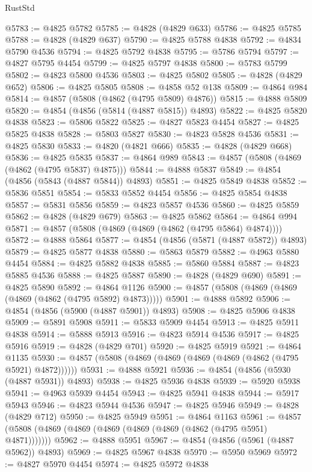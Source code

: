 \begin{lexlean}{RustStd}
\begin{coremodule}
@5783 := @4825 @5782
@5785 := @4828 (@4829 @633)
@5786 := @4825 @5785
@5788 := @4828 (@4829 @637)
@5790 := @4825 @5788 @4838
@5792 := @4834 @5790 @4536
@5794 := @4825 @5792 @4838
@5795 := @5786 @5794
@5797 := @4827 @5795 @4454
@5799 := @4825 @5797 @4838
@5800 := @5783 @5799
@5802 := @4823 @5800 @4536
@5803 := @4825 @5802
@5805 := @4828 (@4829 @652)
@5806 := @4825 @5805
@5808 := @4858 @52 @138
@5809 := @4864 @984
@5814 := @4857 (@5808 (@4862 (@4795 @5809) @4876))
@5815 := @4888 @5809
@5820 := @4854 (@4856 (@5814 (@4887 @5815)) @4893)
@5822 := @4825 @5820 @4838
@5823 := @5806 @5822
@5825 := @4827 @5823 @4454
@5827 := @4825 @5825 @4838
@5828 := @5803 @5827
@5830 := @4823 @5828 @4536
@5831 := @4825 @5830
@5833 := @4820 (@4821 @666)
@5835 := @4828 (@4829 @668)
@5836 := @4825 @5835
@5837 := @4864 @989
@5843 := @4857 (@5808 (@4869 (@4862 (@4795 @5837) @4875)))
@5844 := @4888 @5837
@5849 := @4854 (@4856 (@5843 (@4887 @5844)) @4893)
@5851 := @4825 @5849 @4838
@5852 := @5836 @5851
@5854 := @5833 @5852 @4454
@5856 := @4825 @5854 @4838
@5857 := @5831 @5856
@5859 := @4823 @5857 @4536
@5860 := @4825 @5859
@5862 := @4828 (@4829 @679)
@5863 := @4825 @5862
@5864 := @4864 @994
@5871 := @4857 (@5808 (@4869 (@4869 (@4862 (@4795 @5864) @4874))))
@5872 := @4888 @5864
@5877 := @4854 (@4856 (@5871 (@4887 @5872)) @4893)
@5879 := @4825 @5877 @4838
@5880 := @5863 @5879
@5882 := @4963 @5880 @4454
@5884 := @4825 @5882 @4838
@5885 := @5860 @5884
@5887 := @4823 @5885 @4536
@5888 := @4825 @5887
@5890 := @4828 (@4829 @690)
@5891 := @4825 @5890
@5892 := @4864 @1126
@5900 := @4857 (@5808 (@4869 (@4869 (@4869 (@4862 (@4795 @5892) @4873)))))
@5901 := @4888 @5892
@5906 := @4854 (@4856 (@5900 (@4887 @5901)) @4893)
@5908 := @4825 @5906 @4838
@5909 := @5891 @5908
@5911 := @5833 @5909 @4454
@5913 := @4825 @5911 @4838
@5914 := @5888 @5913
@5916 := @4823 @5914 @4536
@5917 := @4825 @5916
@5919 := @4828 (@4829 @701)
@5920 := @4825 @5919
@5921 := @4864 @1135
@5930 := @4857 (@5808 (@4869 (@4869 (@4869 (@4869 (@4862 (@4795 @5921) @4872))))))
@5931 := @4888 @5921
@5936 := @4854 (@4856 (@5930 (@4887 @5931)) @4893)
@5938 := @4825 @5936 @4838
@5939 := @5920 @5938
@5941 := @4963 @5939 @4454
@5943 := @4825 @5941 @4838
@5944 := @5917 @5943
@5946 := @4823 @5944 @4536
@5947 := @4825 @5946
@5949 := @4828 (@4829 @712)
@5950 := @4825 @5949
@5951 := @4864 @1163
@5961 := @4857 (@5808 (@4869 (@4869 (@4869 (@4869 (@4869 (@4862 (@4795 @5951) @4871)))))))
@5962 := @4888 @5951
@5967 := @4854 (@4856 (@5961 (@4887 @5962)) @4893)
@5969 := @4825 @5967 @4838
@5970 := @5950 @5969
@5972 := @4827 @5970 @4454
@5974 := @4825 @5972 @4838

\end{coremodule}
\end{lexlean}
